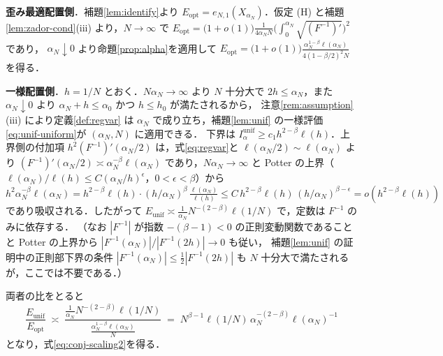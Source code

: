 \documentclass[a4paper,10pt]{jsarticle}
\makeatletter
\theoremstyle{definition}
\renewenvironment{proof}[1][\proofname]{\par
  \pushQED{\qed}%
  \normalfont \topsep6\p@\@plus6\p@\relax
  \trivlist
  \item[\hskip\labelsep\textbf{#1}]\ignorespaces
}{%
  \popQED\endtrivlist\@endpefalse
}
\renewcommand{\proofname}{証明}
\newcommand{\Finv}{F^{-1}}
\newcommand{\eN}{e_{N,1}}
\newcommand{\Eunif}{E_{\mathrm{unif}}}
\newcommand{\Eopt}{E_{\mathrm{opt}}}
\newcommand{\Iunif}{I_\alpha^{\mathrm{unif}}}
\makeatother
\begin{document}
\begin{proof}[系\ref{cor:joint} の証明]
\textbf{歪み最適配置側}．補題\ref{lem:identify}より $\Eopt=\eN(X_{\alpha_N})$．仮定 (H) と補題\ref{lem:zador-cond}(iii) より，$N\to\infty$ で
$\Eopt=\bigl(1+o(1)\bigr)\frac1{4\alpha_N N}\bigl(\int_0^{\alpha_N}\sqrt{(\Finv)'}\bigr)^2$ であり，
$\alpha_N\downarrow0$ より命題\ref{prop:alpha}を適用して
$\Eopt=\bigl(1+o(1)\bigr)\frac{\alpha_N^{1-\beta}\ell(\alpha_N)}{4(1-\beta/2)^2N}$ を得る．

\textbf{一様配置側}．$h=1/N$ とおく．$N\alpha_N\to\infty$ より $N$ 十分大で $2h\le\alpha_N$，また $\alpha_N\downarrow0$ より $\alpha_N+h\le\alpha_0$ かつ $h\le h_0$ が満たされるから，
注意\ref{rem:assumption}(iii) により定義\ref{def:regvar} は $\alpha_N$ で成り立ち，補題\ref{lem:unif} の一様評価\eqref{eq:unif-uniform}が $(\alpha_N,N)$ に適用できる．
下界は $\Iunif\ge c_1h^{2-\beta}\ell(h)$．上界側の付加項 $h^2(\Finv)'(\alpha_N/2)$ は，式\eqref{eq:regvar}と $\ell(\alpha_N/2)\sim\ell(\alpha_N)$ より
$(\Finv)'(\alpha_N/2)\asymp\alpha_N^{-\beta}\ell(\alpha_N)$ であり，$N\alpha_N\to\infty$ と Potter の上界（$\ell(\alpha_N)/\ell(h)\le C(\alpha_N/h)^{\epsilon}$，$0<\epsilon<\beta$）から
$h^2\alpha_N^{-\beta}\ell(\alpha_N)=h^{2-\beta}\ell(h)\cdot(h/\alpha_N)^{\beta}\,\frac{\ell(\alpha_N)}{\ell(h)}\le C\,h^{2-\beta}\ell(h)\,(h/\alpha_N)^{\beta-\epsilon}=o(h^{2-\beta}\ell(h))$
であり吸収される．したがって $\Eunif\asymp\frac1{\alpha_N}N^{-(2-\beta)}\ell(1/N)$ で，定数は $\Finv$ のみに依存する．
（なお $|\Finv|$ が指数 $-(\beta-1)<0$ の正則変動関数であることと Potter の上界から $|\Finv(\alpha_N)|/|\Finv(2h)|\to0$ も従い，
補題\ref{lem:unif} の証明中の正則部下界の条件 $|\Finv(\alpha_N)|\le\frac12|\Finv(2h)|$ も $N$ 十分大で満たされるが，ここでは不要である．）

両者の比をとると
\begin{equation*}
  \frac{\Eunif}{\Eopt}
  \;\asymp\;\frac{\frac1{\alpha_N}N^{-(2-\beta)}\ell(1/N)}{\frac{\alpha_N^{1-\beta}\ell(\alpha_N)}{N}}
  \;=\;N^{\beta-1}\ell(1/N)\,\alpha_N^{-(2-\beta)}\ell(\alpha_N)^{-1}
\end{equation*}
となり，式\eqref{eq:conj-scaling2}を得る．
\end{proof}
\end{document}
